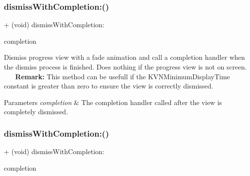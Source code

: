 \subsubsection{\texorpdfstring{dismiss\+With\+Completion\+:()}{dismissWithCompletion:()}\hspace{0.1cm}{\footnotesize\ttfamily [1/3]}}
{\footnotesize\ttfamily + (void) dismiss\+With\+Completion\+: \begin{DoxyParamCaption}\item[{(K\+V\+N\+Completion\+Block)}]{completion }\end{DoxyParamCaption}}

Dismiss progress view with a fade animation and call a completion handler when the dismiss process is finished. Does nothing if the progress view is not on screen. ~\newline
~\newline
{\bfseries Remark\+:} This method can be usefull if the {\ttfamily K\+V\+N\+Minimum\+Display\+Time} constant is greater than zero to ensure the view is correctly dismissed. 
\begin{DoxyParams}{Parameters}
{\em completion} & The completion handler called after the view is completely dismissed. \\
\hline
\end{DoxyParams}
\mbox{\label{interface_k_v_n_progress_a7ec9c844ebb26d0f9cdff6ef3d737d28}} 
\subsubsection{\texorpdfstring{dismiss\+With\+Completion\+:()}{dismissWithCompletion:()}\hspace{0.1cm}{\footnotesize\ttfamily [2/3]}}
{\footnotesize\ttfamily + (void) dismiss\+With\+Completion\+: \begin{DoxyParamCaption}\item[{(K\+V\+N\+Completion\+Block)}]{completion }\end{DoxyParamCaption}}

